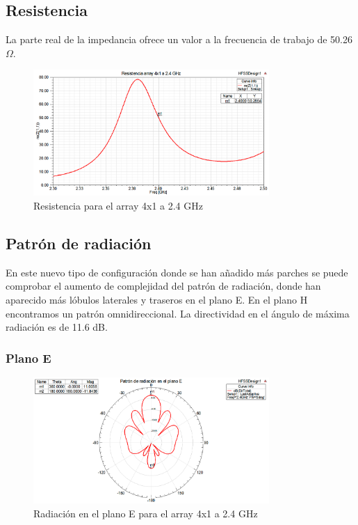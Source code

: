 \subsection{Resistencia}
\par La parte real de la impedancia ofrece un valor a la frecuencia de trabajo de 50.26 $\Omega$.
\\
\begin{figure}[H]
    \centering
        \includegraphics[width=0.8\textwidth]{archivos/analisis/4x11/3}
        \caption{Resistencia para el array 4x1 a 2.4 GHz}
        \label{fig:resis4x11}
\end{figure}

\subsection{Patrón de radiación}
\par En este nuevo tipo de configuración donde se han añadido más parches se puede comprobar el aumento de complejidad del patrón de radiación, donde han aparecido más lóbulos laterales y traseros en el plano E. En el plano H encontramos un patrón omnidireccional. La directividad en el ángulo de máxima radiación es de 11.6 dB.
\\
\subsubsection{Plano E}
\begin{figure}[H]
    \centering
        \includegraphics[width=0.8\textwidth]{archivos/analisis/4x11/4}
        \caption{Radiación en el plano E para el array 4x1 a 2.4 GHz}
        \label{fig:E4x11}
\end{figure}

